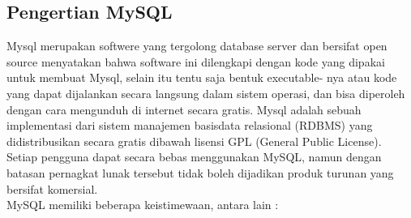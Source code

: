 \documentclass{jtetiproposalskripsi}
\begin{document}
\subsection{Pengertian MySQL}
Mysql  merupakan  softwere  yang  tergolong  database  server  dan bersifat open source menyatakan bahwa software ini dilengkapi dengan kode yang dipakai untuk membuat Mysql, selain itu tentu saja bentuk executable- nya atau kode yang dapat dijalankan secara langsung dalam sistem operasi, dan bisa diperoleh dengan cara mengunduh di internet secara gratis. Mysql adalah sebuah implementasi dari sistem manajemen basisdata relasional (RDBMS) yang didistribusikan secara gratis dibawah lisensi GPL (General Public License). Setiap pengguna dapat secara bebas menggunakan MySQL, namun dengan batasan pernagkat lunak tersebut tidak boleh dijadikan produk turunan yang bersifat komersial.
\\
MySQL memiliki beberapa keistimewaan, antara lain :
\end{document}
